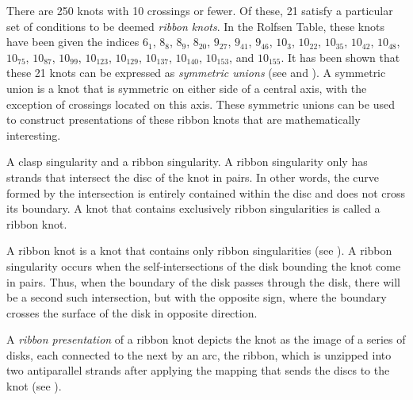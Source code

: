 \begin{paper}

There are 250 knots with 10 crossings or fewer.
Of these, 21 satisfy a particular set of conditions to be deemed \textit{ribbon
knots}.
In the Rolfsen Table, these knots have been given the indices $6_1$, $8_8$,
$8_9$, $8_{20}$, $9_{27}$, $9_{41}$, $9_{46}$, $10_3$, $10_{22}$, $10_{35}$,
$10_{42}$, $10_{48}$, $10_{75}$, $10_{87}$, $10_{99}$, $10_{123}$, $10_{129}$,
$10_{137}$, $10_{140}$, $10_{153}$, and $10_{155}$.
It has been shown that these 21 knots can be expressed as \textit{symmetric
unions} (see \cite{many} and \cite{one}).
A symmetric union is a knot that is symmetric on either side of a central axis,
with the exception of crossings located on this axis.
These symmetric unions can be used to construct presentations of these ribbon
knots that are mathematically interesting.

{A clasp singularity and a ribbon singularity.
A ribbon singularity only has strands that intersect the disc of the knot in
pairs.
In other words, the curve formed by the intersection is entirely contained
within the disc and does not cross its boundary.
A knot that contains exclusively ribbon singularities is called a ribbon knot.}

A ribbon knot is a knot that contains only ribbon singularities (see
\figSingularities).
A ribbon singularity occurs when the self-intersections of the disk bounding the
knot come in pairs.
Thus, when the boundary of the disk passes through the disk, there will be a
second such intersection, but with the opposite sign, where the boundary crosses
the surface of the disk in opposite direction.


A \textit{ribbon presentation} of a ribbon knot depicts the knot as the image of
a series of disks, each connected to the next by an arc, the ribbon, which is
unzipped into two antiparallel strands after applying the mapping that sends the
discs to the knot (see \figPresentation).


\end{paper}
